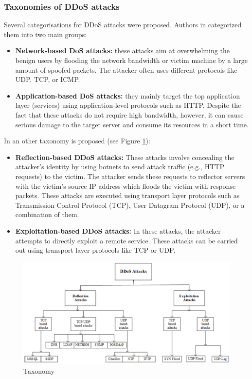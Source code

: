 \subsubsection{Taxonomies of DDoS attacks}
Several categorisations for DDoS attacks were proposed. Authors in
\cite{insdn} categorized them into two main groups: 
\begin{itemize}
    \item \textbf{Network-based DoS attacks:} these attacks  aim at overwhelming the benign users by flooding the network bandwidth or victim machine by a large amount of spoofed packets. The attacker often uses different protocols like UDP, TCP, or ICMP.
    \item \textbf{Application-based  DoS attacks:} they mainly target the top application layer (services) using application-level protocols  such as HTTP. Despite the fact that these attacks do not require high bandwidth, however, it can cause serious damage to the target server and consume its resources in a short time.
\end{itemize}

In \cite{ddos2019} an other taxonomy is proposed (see Figure \ref{fig:cicDDosTaxonomy}):
\begin{itemize}
    \item \textbf{Reflection-based DDoS attacks:} These attacks involve concealing the attacker's identity by using botnets to send attack traffic (e.g., HTTP requests) to the victim. The attacker sends these requests to reflector servers with the victim’s source IP address which floods the victim with response packets. These attacks are executed using transport layer protocols such as Transmission Control Protocol (TCP), User Datagram Protocol (UDP), or a combination of them.
    \item \textbf{Exploitation-based DDoS attacks:} In these attacks, the attacker attempts to directly exploit a remote service. These attacks can be carried out using transport layer protocols like TCP or UDP.
\end{itemize}


\begin{figure}
    \centering
    \includegraphics[scale=0.6]{figures/cicDDosTaxonomy.png}
    \captionsetup{font=large}
    \caption{ Taxonomy}
    \label{fig:cicDDosTaxonomy}
\end{figure}



